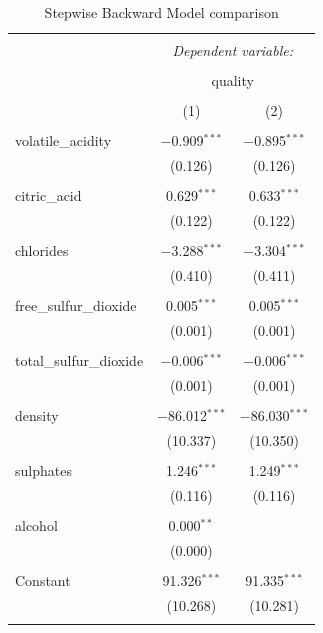 \documentclass[a4paper,9pt,twocolumn,twoside,]{pinp}
\begin{document}
\begin{table}[!htbp] \centering 
  \caption{Stepwise Backward Model comparison} 
  \label{} 
\begin{tabular}{@{\extracolsep{5pt}}lcc} 
\\[-1.8ex]\hline 
\hline \\[-1.8ex] 
 & \multicolumn{2}{c}{\textit{Dependent variable:}} \\ 
\cline{2-3} 
\\[-1.8ex] & \multicolumn{2}{c}{quality} \\ 
\\[-1.8ex] & (1) & (2)\\ 
\hline \\[-1.8ex] 
 volatile\_acidity & $-$0.909$^{***}$ & $-$0.895$^{***}$ \\ 
  & (0.126) & (0.126) \\ 
  & & \\ 
 citric\_acid & 0.629$^{***}$ & 0.633$^{***}$ \\ 
  & (0.122) & (0.122) \\ 
  & & \\ 
 chlorides & $-$3.288$^{***}$ & $-$3.304$^{***}$ \\ 
  & (0.410) & (0.411) \\ 
  & & \\ 
 free\_sulfur\_dioxide & 0.005$^{***}$ & 0.005$^{***}$ \\ 
  & (0.001) & (0.001) \\ 
  & & \\ 
 total\_sulfur\_dioxide & $-$0.006$^{***}$ & $-$0.006$^{***}$ \\ 
  & (0.001) & (0.001) \\ 
  & & \\ 
 density & $-$86.012$^{***}$ & $-$86.030$^{***}$ \\ 
  & (10.337) & (10.350) \\ 
  & & \\ 
 sulphates & 1.246$^{***}$ & 1.249$^{***}$ \\ 
  & (0.116) & (0.116) \\ 
  & & \\ 
 alcohol & 0.000$^{**}$ &  \\ 
  & (0.000) &  \\ 
  & & \\ 
 Constant & 91.326$^{***}$ & 91.335$^{***}$ \\ 
  & (10.268) & (10.281) \\ 
  & & \\ 

\end{tabular}
\end{table}
\end{document}
